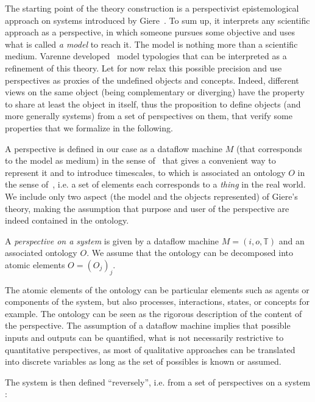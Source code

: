 The starting point of the theory construction is a perspectivist epistemological approach on systems introduced by Giere~\cite{giere2010scientific}.  To sum up, it interprets any scientific approach as a perspective, in which someone pursues some objective and uses what is called \emph{a model} to reach it. The model is nothing more than a scientific medium. Varenne developed~\cite{varenne2010framework} model typologies that can be interpreted as a refinement of this theory. Let for now relax this possible precision and use perspectives as proxies of the undefined objects and concepts. Indeed, different views on the same object (being complementary or diverging) have the property to share at least the object in itself, thus the proposition to define objects (and more generally systems) from a set of perspectives on them, that verify some properties that we formalize in the following.

A perspective is defined in our case as a dataflow machine $M$ (that corresponds to the model as medium) in the sense of~\cite{golden2012modeling} that gives a convenient way to represent it and to introduce timescales, to which is associated an ontology $O$ in the sense of~\cite{livet2010}, i.e. a set of elements each corresponds to a \emph{thing} %
 in the real world. We include only two aspect (the model and the objects represented) of Giere's theory, making the assumption that purpose and user of the perspective are indeed contained in the ontology.

\begin{definition}
A \emph{perspective on a system} is given by a dataflow machine $M = (i,o,\mathbb{T})$ and an associated ontology $O$. We assume that the ontology can be decomposed into atomic elements $O=(O_j)_j$.
\end{definition}

The atomic elements of the ontology can be particular elements such as agents or components of the system, but also processes, interactions, states, or concepts for example. The ontology can be seen as the rigorous description of the content of the perspective. The assumption of a dataflow machine implies that possible inputs and outputs can be quantified, what is not necessarily restrictive to quantitative perspectives, as most of qualitative approaches can be translated into discrete variables as long as the set of possibles is known or assumed. 

The system is then defined ``reversely'', i.e. from a set of perspectives on a system :

